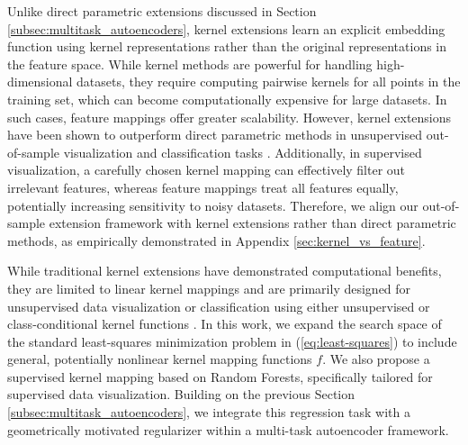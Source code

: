 Unlike direct parametric extensions discussed in Section \ref{subsec:multitask_autoencoders}, kernel extensions learn an explicit embedding function using kernel representations rather than the original representations in the feature space. While kernel methods are powerful for handling high-dimensional datasets, they require computing pairwise kernels for all points in the training set, which can become computationally expensive for large datasets. In such cases, feature mappings offer greater scalability. However, kernel extensions have been shown to outperform direct parametric methods in unsupervised out-of-sample visualization and classification tasks \cite{Gisbrecht2015kernel-tsne, Ran2024kumap}. Additionally, in supervised visualization, a carefully chosen kernel mapping can effectively filter out irrelevant features, whereas feature mappings treat all features equally, potentially increasing sensitivity to noisy datasets. Therefore, we align our out-of-sample extension framework with kernel extensions rather than direct parametric methods, as empirically demonstrated in Appendix \ref{sec:kernel_vs_feature}.


While traditional kernel extensions have demonstrated computational benefits, they are limited to linear kernel mappings and are primarily designed for unsupervised data visualization or classification using either unsupervised or class-conditional kernel functions \cite{Gisbrecht2015kernel-tsne, Ran2024kumap}. In this work, we expand the search space of the standard least-squares minimization problem in (\ref{eq:least-squares}) to include general, potentially nonlinear kernel mapping functions \(f\). We also propose a supervised kernel mapping based on Random Forests, specifically tailored for supervised data visualization. Building on the previous Section \ref{subsec:multitask_autoencoders}, we integrate this regression task with a geometrically motivated regularizer within a multi-task autoencoder framework.